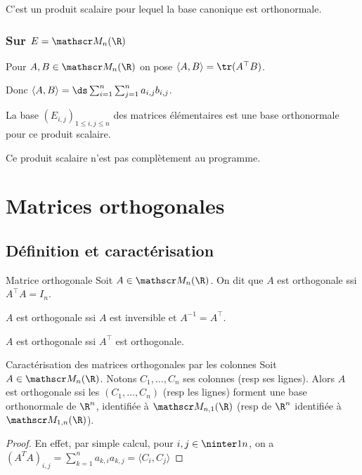 C'est un produit scalaire pour lequel la base canonique est orthonormale.

\subsubsection{Sur \texorpdfstring{$E = \mathscr M_n(\R)$}{E = Mn(R)}}

Pour $A, B \in \mathscr M_n(\R)$ on pose $\langle A, B \rangle = \tr(A^\top B)$.

Donc $\langle A, B \rangle = \ds \sum_{i = 1}^n \sum_{j = 1}^n a_{i,j} b_{i,j}$.

La base $(E_{i,j})_{1 \leqslant i, j \leqslant n}$ des matrices élémentaires est une base orthonormale pour ce produit scalaire.

Ce produit scalaire n'est pas complètement au programme. 

\section{Matrices orthogonales}
\subsection{Définition et caractérisation} 

\begin{definition}{Matrice orthogonale}{}
    Soit $A \in \mathscr M_n(\R)$. On dit que $A$ est orthogonale ssi $A^\top A = I_n$.
\end{definition}

\begin{remarque}
    $A$ est orthogonale ssi $A$ est inversible et $A^{-1} = A^\top$. 

    $A$ est orthogonale ssi $A^\top$ est orthogonale.
\end{remarque}

\begin{proposition}{Caractérisation des matrices orthogonales par les colonnes}{}
    Soit $A \in \mathscr M_n(\R)$. Notons $C_1, \dots, C_n$ ses colonnes (resp ses lignes). 
    Alors $A$ est orthogonale ssi les $(C_1, \dots, C_n)$ (resp les lignes) forment une base orthonormale de $\R^n$,
    identifiée à $\mathscr M_{n,1}(\R)$ (resp de $\R^n$ identifiée à $\mathscr M_{1,n}(\R)$).
\end{proposition}

\begin{proof}
    En effet, par simple calcul, pour $i, j \in \ninter 1 n$, on a 
    $(A^TA)_{i, j} = \sum_{k=1}^{n} a_{k, i} a_{k, j} = \langle C_i, C_j \rangle$ 
\end{proof}


